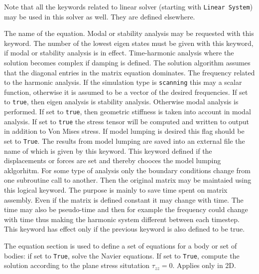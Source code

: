 \sifbegin

Note that all the keywords related to linear solver (starting
with {\tt Linear System})
may be used in this solver as well.  They are defined elsewhere. 

\sifbegin
{} 
The name of the equation.
Modal or stability analysis may be requested with this keyword.
The number of the lowest eigen states must be given with this keyword,
if modal or stability analysis is in effect.
Time-harmonic analysis where the solution becomes complex if damping is defined. 
The solution algorithm assumes that the diagonal entries in the matrix equation dominates.
The frequency related to the harmonic analysis. If the simulation type is \texttt{scanning} 
this may a scalar function, otherwise it is assumed to be a vector of the desired frequencies.
If set to {\tt{true}}, then eigen analysis is stability analysis.
Otherwise modal analysis is performed.
If set to {\tt{true}}, then geometric stiffness is taken into account in modal analysis.
If set to {\tt{true}} the stress tensor will be computed and written to
output in addition to Von Mises stress.
If model lumping is desired this flag should be set to \texttt{True}.
The results from model lumping are saved into an external file the 
name of which is given by this keyword.
This keyword defined if the displacements or forces are set and thereby chooces the 
model lumping aklgorhitm. 
For some type of analysis only the boundary conditions change from one subroutine call to another.
Then the original matrix may be maintaied using this logical keyword. The purpose is mainly to save 
time spent on matrix assembly.
Even if the matrix is defined constant it may change with time. The 
time may also be pseudo-time and then for example the frequency could change with time thus making the 
harmonic system different between each timestep. This keyword has effect only if the previous keyword is also
defined to be true.
\sifend

The equation section is used to define a set of equations for a body or set of bodies:
\sifbegin
{} if set to {\tt True}, solve the Navier equations.
 If set to {\tt True}, compute the solution
according to the plane stress situtation $\tau_{zz}=0$. Applies only in 2D.
\sifend


